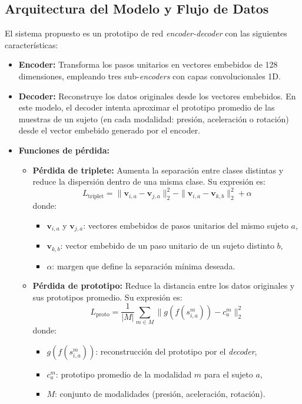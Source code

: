 \documentclass{report}
\begin{document}
\subsection{Arquitectura del Modelo y Flujo de Datos}
El sistema propuesto es un prototipo de red \textit{encoder-decoder} con las siguientes características:
\begin{itemize}
    \item \textbf{Encoder:} Transforma los pasos unitarios en vectores embebidos de 128 dimensiones, empleando tres sub-\textit{encoders} con capas convolucionales 1D.
    \item \textbf{Decoder:} Reconstruye los datos originales desde los vectores embebidos. En este modelo, el decoder intenta aproximar el prototipo promedio de las muestras de un sujeto (en cada modalidad: presión, aceleración o rotación) desde el vector embebido generado por el encoder.
    \item \textbf{Funciones de pérdida:}
    \begin{itemize}
        \item \textbf{Pérdida de triplete:} Aumenta la separación entre clases distintas y reduce la dispersión dentro de una misma clase. Su expresión es:
        \[
        L_{\text{triplet}} = \|\mathbf{v}_{i,a} - \mathbf{v}_{j,a}\|^2_2 - \|\mathbf{v}_{i,a} - \mathbf{v}_{k,b}\|^2_2 + \alpha
        \]
        donde:
        \begin{itemize}
            \item \(\mathbf{v}_{i,a}\) y \(\mathbf{v}_{j,a}\): vectores embebidos de pasos unitarios del mismo sujeto \(a\),
            \item \(\mathbf{v}_{k,b}\): vector embebido de un paso unitario de un sujeto distinto \(b\),
            \item \(\alpha\): margen que define la separación mínima deseada.
        \end{itemize}
        \item \textbf{Pérdida de prototipo:} Reduce la distancia entre los datos originales y sus prototipos promedio. Su expresión es:
        \[
        L_{\text{proto}} = \frac{1}{|M|} \sum_{m \in M} \|g(f(s^m_{i,a})) - c^m_a\|^2_2
        \]
        donde:
        \begin{itemize}
            \item \(g(f(s^m_{i,a}))\): reconstrucción del prototipo por el \textit{decoder},
            \item \(c^m_a\): prototipo promedio de la modalidad \(m\) para el sujeto \(a\),
            \item \(M\): conjunto de modalidades (presión, aceleración, rotación).
        \end{itemize}
    \end{itemize}
\end{itemize}
\end{document}
